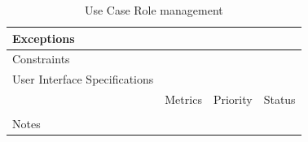 \begin{table}[H]
\begin{tabularx}{\linewidth}{|l|X|X|X|}
            \hline Exceptions                    & \multicolumn{3}{l|}{}                                                                                 \\

            \hline Constraints                   & \multicolumn{3}{l|}{}                                                                                 \\

            \hline User Interface Specifications & \multicolumn{3}{l|}{}                                                                                 \\

            \hline \multirow{2}{*}{}             & Metrics                                                                           & Priority & Status \\
            \cline{2-4}                          &                                                                                   &          &        \\
            \hline Notes                         & \multicolumn{3}{l|}{}                                                                                 \\
            \hline
      \end{tabularx}
      \caption{Use Case Role management}
      \label{tab:use_case_role_management}
\end{table}

